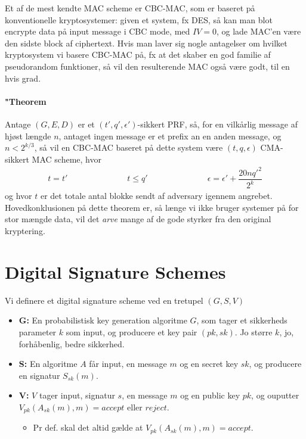 \documentclass[paper=a4, fontsize=11pt]{scrartcl} %
\numberwithin{equation}{section} %
\numberwithin{figure}{section} %
\numberwithin{table}{section} %
\begin{document}
	Et af de mest kendte MAC scheme er CBC-MAC, som er baseret på konventionelle kryptosystemer: given et system, fx DES, så kan man blot encrypte data  på input message i CBC mode, med $IV=0$, og lade MAC'en være den sidste block af ciphertext. Hvis man laver sig nogle antagelser om hvilket kryptosystem vi basere CBC-MAC på, fx at det skaber en god familie af pseudorandom funktioner, så vil den resulterende MAC også være godt, til en hvis grad.
	
	\paragraph{\textbf{"Theorem}} Antage $(G,E,D)$ er et $(t',q',\epsilon')$-sikkert PRF, så, for en vilkårlig message af hjøst længde $n$, antaget ingen message er et prefix an en anden message, og $n<2^{k/3}$, så vil en CBC-MAC baseret på dette system være $(t,q,\epsilon)$ CMA-sikkert MAC scheme, hvor
	\begin{align*}
	t=t' \hspace{3cm} t\leq q' \hspace{3cm} \epsilon=\epsilon' +\dfrac{20nq'^{2}}{2^k}
	\end{align*}
	og hvor $t$ er det totale antal blokke sendt af adversary igennem angrebet. \\
	
	Hovedkonklusionen på dette theorem er, så længe vi ikke bruger systemer på for stor mængde data, vil det \textit{arve} mange af de gode styrker fra den original kryptering.
	
	\newpage
	
	\section{Digital Signature Schemes}
	
	Vi definere et digital signature scheme ved en tretupel $(G,S,V)$
	\begin{itemize}
		\item \textbf{G:} En probabilistisk key generation algoritme $G$, som tager et sikkerheds parameter $k$ som input, og producere et key pair $(pk,sk)$. Jo større $k$, jo, forhåbenlig, bedre sikkerhed.
		\item \textbf{S:} En algoritme $A$ får input, en message $m$ og en secret key $sk$, og producere en signatur $S_{sk}(m)$.
		\item \textbf{V:} $V$ tager input, signatur $s$, en message $m$ og en public key $pk$, og ouputter $V_{pk}(A_{sk}(m),m)=accept$ eller $reject$. 
		\begin{itemize}
			\item Pr def. skal det altid gælde at $V_{pk}(A_{sk}(m),m)=accept$. 
		\end{itemize}
	\end{itemize}
	
\end{document}
